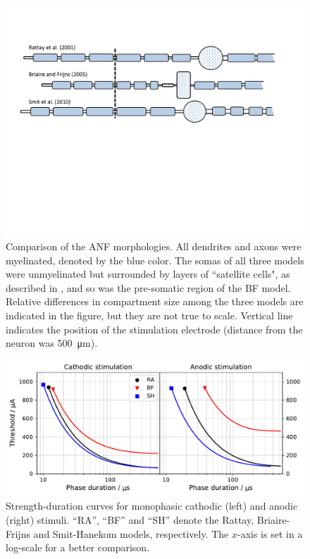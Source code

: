 \documentclass[utf8]{frontiersSCNS} %
\begin{document}
\begin{figure}[h!]
\begin{center}
\includegraphics[width=\linewidth]{images/Morphologies.pdf}
\end{center}
\caption{Comparison of the ANF morphologies. All dendrites and axons were myelinated, denoted by the blue color. The somas of all three models were unmyelinated but surrounded by layers of ``satellite cells", as described in \cite{Rattay2001}, and so was the pre-somatic region of the BF model.
Relative differences in compartment size among the three models are indicated in the figure, but they are not true to scale. Vertical line indicates the position of the stimulation electrode (distance from the neuron was \SI{500}{\micro\meter}).
}
\label{fig:morphologies}
\end{figure}

\begin{figure}[h!]
\begin{center}
\includegraphics[width=\linewidth]{images/strength_duration_curve_comparison.pdf}
\end{center}
\caption{Strength-duration curves for monophasic cathodic (left) and anodic (right) stimuli. ``RA'', ``BF'' and ``SH'' denote the Rattay, Briaire-Frijns and Smit-Hanekom models, respectively. The $x$-axis is set in a log-scale for a better comparison.}
\label{fig:Strength_duration_curve_comparison}
\end{figure}
\end{document}
